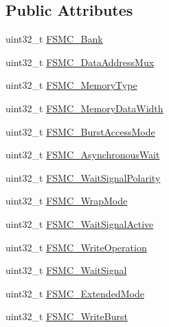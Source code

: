 \subsection*{Public Attributes}
\begin{DoxyCompactItemize}
\item 
uint32\+\_\+t \hyperlink{struct_f_s_m_c___n_o_r_s_r_a_m_init_type_def_a7fcd864461cf0d1cf83b62fa2b4d3f86}{F\+S\+M\+C\+\_\+\+Bank}
\item 
uint32\+\_\+t \hyperlink{struct_f_s_m_c___n_o_r_s_r_a_m_init_type_def_af4ff95085d3bb39e34c2f88ca3140ce5}{F\+S\+M\+C\+\_\+\+Data\+Address\+Mux}
\item 
uint32\+\_\+t \hyperlink{struct_f_s_m_c___n_o_r_s_r_a_m_init_type_def_a979ad605c6a63923e060576ee01e888d}{F\+S\+M\+C\+\_\+\+Memory\+Type}
\item 
uint32\+\_\+t \hyperlink{struct_f_s_m_c___n_o_r_s_r_a_m_init_type_def_a1791c771ff86f5dc5422040409517e9d}{F\+S\+M\+C\+\_\+\+Memory\+Data\+Width}
\item 
uint32\+\_\+t \hyperlink{struct_f_s_m_c___n_o_r_s_r_a_m_init_type_def_aec0bfff5c934c251c21450a50f5bdb79}{F\+S\+M\+C\+\_\+\+Burst\+Access\+Mode}
\item 
uint32\+\_\+t \hyperlink{struct_f_s_m_c___n_o_r_s_r_a_m_init_type_def_ac350cc34377fe3d5f882a6801bab1ac9}{F\+S\+M\+C\+\_\+\+Asynchronous\+Wait}
\item 
uint32\+\_\+t \hyperlink{struct_f_s_m_c___n_o_r_s_r_a_m_init_type_def_a5d4d76594fc201943b51095e3ef34791}{F\+S\+M\+C\+\_\+\+Wait\+Signal\+Polarity}
\item 
uint32\+\_\+t \hyperlink{struct_f_s_m_c___n_o_r_s_r_a_m_init_type_def_a7e201c17bf7c5f6cc69fb6de29c8b024}{F\+S\+M\+C\+\_\+\+Wrap\+Mode}
\item 
uint32\+\_\+t \hyperlink{struct_f_s_m_c___n_o_r_s_r_a_m_init_type_def_a71c6e7cc8e7e1a8fd0562960ffd23e88}{F\+S\+M\+C\+\_\+\+Wait\+Signal\+Active}
\item 
uint32\+\_\+t \hyperlink{struct_f_s_m_c___n_o_r_s_r_a_m_init_type_def_a596793d1735c4e38c87e3bf91d986370}{F\+S\+M\+C\+\_\+\+Write\+Operation}
\item 
uint32\+\_\+t \hyperlink{struct_f_s_m_c___n_o_r_s_r_a_m_init_type_def_aedbc7df3ff61cc93a910a64dc53c932b}{F\+S\+M\+C\+\_\+\+Wait\+Signal}
\item 
uint32\+\_\+t \hyperlink{struct_f_s_m_c___n_o_r_s_r_a_m_init_type_def_af33d0076b5bfea3a66e388ed7f3eb3f3}{F\+S\+M\+C\+\_\+\+Extended\+Mode}
\item 
uint32\+\_\+t \hyperlink{struct_f_s_m_c___n_o_r_s_r_a_m_init_type_def_adac3756711f2d76e56a8cbcb7a03843d}{F\+S\+M\+C\+\_\+\+Write\+Burst}

\end{DoxyCompactItemize}
